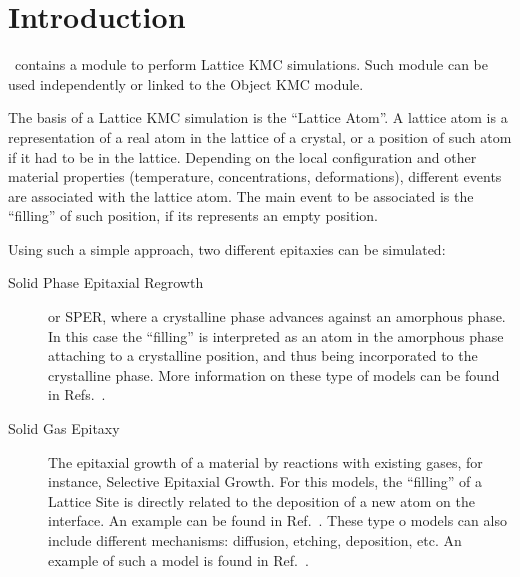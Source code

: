 
\section{Introduction}

\MMonCa\ contains a module to perform Lattice KMC simulations. Such module can be used independently or linked to the Object KMC module. 

The basis of a Lattice KMC simulation is the ``Lattice Atom''. A lattice atom is a representation of a real atom in the lattice of a crystal, or a position of such atom if it had to be in the lattice. Depending on the local configuration and other material properties (temperature, concentrations, deformations), different events are associated with the lattice atom. The main event to be associated is the ``filling'' of such position, if its represents an empty position. 

Using such a simple approach, two different  epitaxies can be simulated:
\begin{description}

\item[Solid Phase Epitaxial Regrowth] or SPER, where a crystalline phase advances against an amorphous phase. In this case the ``filling'' is interpreted as an atom in the amorphous phase attaching to a crystalline position, and thus being incorporated to the crystalline phase. More information on these type of models can be found in Refs.~\cite{MARTIN-BRAGADO-APL09,MARTIN-BRAGADO-APL11,MARTIN-BRAGADO-JAP12}.

\item[Solid Gas Epitaxy] The epitaxial growth of a material by reactions with existing gases, for instance, Selective Epitaxial Growth. For this models, the ``filling'' of a Lattice Site is directly related to the deposition of a new atom on the interface. An example can be found in Ref.~\cite{MARTIN-BRAGADO-APL11b}. These type o models can also include different mechanisms: diffusion, etching, deposition, etc. An example of such a model is found in Ref.~\cite{CHEN-SISPAD13}.
\end{description}

